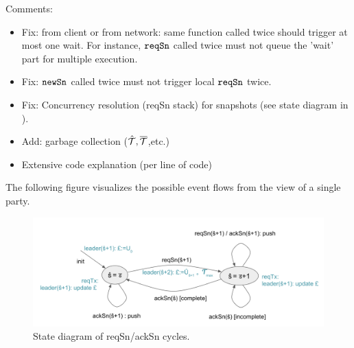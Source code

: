 Comments: 
\begin{itemize}
\item Fix: from client or from network: same function called twice should trigger at most one wait.
  For instance, $\mathtt{reqSn}$ called twice must not queue the 'wait' part for multiple execution.
\item Fix: $\mathtt{newSn}$ called twice must not trigger local $\mathtt{reqSn}$ twice.
\item Fix: Concurrency resolution (reqSn stack) for snapshots (see state diagram in \cite{hydraspec22}).
\item Add: garbage collection ($\hat {\mathcal T},\overline {\mathcal T}$,etc.)
\item Extensive code explanation (per line of code)
\end{itemize}

The following figure visualizes the possible event flows from the view of a single party.
\begin{figure}[ht]
  \centering
  \includegraphics[width=\linewidth*2/3]{fig/reqackstates.png}
                  \caption{State diagram of reqSn/ackSn cycles.}
                  \label{fig:sim:baselines}
\end{figure}

